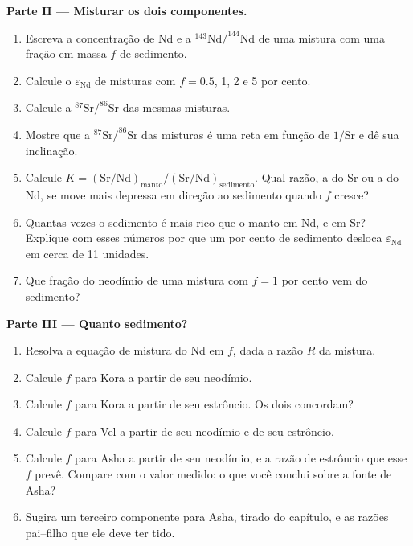 \begin{problem}
\noindent\textbf{Parte II --- Misturar os dois componentes.}
\begin{enumerate}[resume]
\item Escreva a concentração de Nd e a $^{143}\mathrm{Nd}/^{144}\mathrm{Nd}$ de uma
mistura com uma fração em massa $f$ de sedimento.
\item Calcule o $\varepsilon_{\mathrm{Nd}}$ de misturas com $f = 0.5$, 1, 2 e 5 por
cento.
\item Calcule a $^{87}\mathrm{Sr}/^{86}\mathrm{Sr}$ das mesmas misturas.
\item Mostre que a $^{87}\mathrm{Sr}/^{86}\mathrm{Sr}$ das misturas é uma reta
em função de $1/\mathrm{Sr}$ e dê sua inclinação.
\item Calcule $K = (\mathrm{Sr}/\mathrm{Nd})_{\text{manto}}/(\mathrm{Sr}/\mathrm{Nd})_{\text{sedimento}}$.
Qual razão, a do Sr ou a do Nd, se move mais depressa em direção ao sedimento quando $f$ cresce?
\item Quantas vezes o sedimento é mais rico que o manto em Nd, e em Sr?
Explique com esses números por que um por cento de sedimento desloca
$\varepsilon_{\mathrm{Nd}}$ em cerca de 11 unidades.
\item Que fração do neodímio de uma mistura com $f = 1$ por cento vem do
sedimento?
\end{enumerate}

\noindent\textbf{Parte III --- Quanto sedimento?}
\begin{enumerate}[resume]
\item Resolva a equação de mistura do Nd em $f$, dada a razão $R$ da mistura.
\item Calcule $f$ para Kora a partir de seu neodímio.
\item Calcule $f$ para Kora a partir de seu estrôncio. Os dois concordam?
\item Calcule $f$ para Vel a partir de seu neodímio e de seu estrôncio.
\item Calcule $f$ para Asha a partir de seu neodímio, e a razão de estrôncio que esse $f$
prevê. Compare com o valor medido: o que você conclui sobre a fonte de
Asha?
\item Sugira um terceiro componente para Asha, tirado do capítulo, e as
razões pai--filho que ele deve ter tido.
\end{enumerate}


\end{problem}
